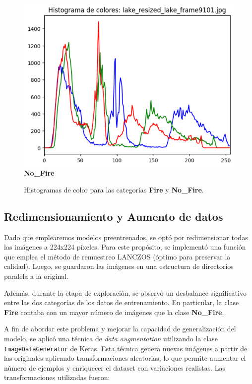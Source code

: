 \begin{enumerate}
\begin{figure}[htbp]
\begin{minipage}[b]{0.45\textwidth}
          \includegraphics[width=\linewidth]{images/histograma_no_fire.png}
          \vspace{0.5em}
          \small\textbf{No\_Fire}
        \end{minipage}
        \caption{Histogramas de color para las categorías \textbf{Fire} y \textbf{No\_Fire}.}
        \label{fig:histograms}
      \end{figure}

\end{enumerate}

\subsection{Redimensionamiento y Aumento de datos}
Dado que emplearemos modelos preentrenados, se optó por redimensionar todas las imágenes 
a 224x224 píxeles. Para este propósito, se implementó una función que emplea 
el método de remuestreo LANCZOS (óptimo para preservar la calidad). Luego, se guardaron las imágenes
en una estructura de directorios paralela a la original.

Además, durante la etapa de exploración, se observó un desbalance significativo entre las 
dos categorías de los datos de entrenamiento. En particular, la clase \textbf{Fire} contaba con un mayor número 
de imágenes que la clase \textbf{No\_Fire}. 

A fin de abordar este problema y mejorar la capacidad de generalización del modelo, 
se aplicó una técnica de \emph{data augmentation} utilizando la clase \texttt{ImageDataGenerator} de Keras. 
Esta técnica genera nuevas imágenes a partir de las originales aplicando transformaciones aleatorias, 
lo que permite aumentar el número de ejemplos y enriquecer el dataset con variaciones realistas. 
Las transformaciones utilizadas fueron:

